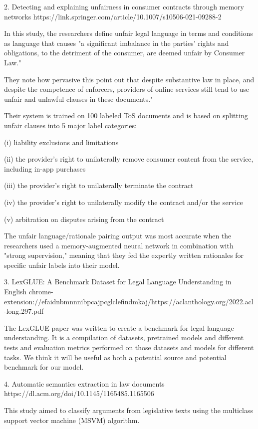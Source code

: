 \documentclass[11pt,a4paper]{article}
\begin{document}
2. Detecting and explaining unfairness in consumer contracts through memory networks
https://link.springer.com/article/10.1007/s10506-021-09288-2

In this study, the researchers define unfair legal language in terms and conditions as language that causes "a significant imbalance in the parties' rights and obligations, to the detriment of the consumer, are deemed unfair by Consumer Law."

They note how pervasive this point out that despite substantive law in place, and despite the competence of enforcers, providers of online services still tend to use unfair and unlawful clauses in these documents."

Their system is trained on 100 labeled ToS documents and is based on splitting unfair clauses into 5 major label categories:

(i) liability exclusions and limitations

(ii) the provider’s right to unilaterally remove consumer content from the service, including in-app purchases

(iii) the provider’s right to unilaterally terminate the contract

(iv) the provider’s right to unilaterally modify the contract and/or the service

(v) arbitration on disputes arising from the contract

The unfair language/rationale pairing output was most accurate when the researchers used a memory-augmented neural network in combination with "strong supervision," meaning that they fed the expertly written rationales for specific unfair labels into their model.

3. LexGLUE: A Benchmark Dataset for Legal Language Understanding in English
chrome-extension://efaidnbmnnnibpcajpcglclefindmkaj/https://aclanthology.org/2022.acl-long.297.pdf

The LexGLUE paper was written to create a benchmark for legal language understanding. It is a compilation of datasets, pretrained models and different tests and evaluation metrics performed on those datasets and models for different tasks. We think it will be useful as both a potential source and potential benchmark for our model.

4. Automatic semantics extraction in law documents
https://dl.acm.org/doi/10.1145/1165485.1165506 

This study aimed to classify arguments from legislative texts using the multiclass support vector machine (MSVM) algorithm.
\end{document}
